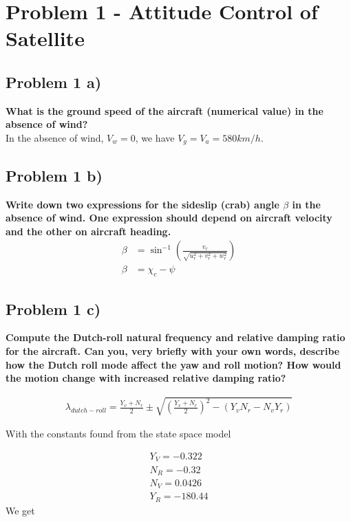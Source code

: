\section*{Problem 1 - Attitude Control of Satellite}

\subsection*{Problem 1 a)} 

\textbf{What is the ground speed of the aircraft (numerical value) in the absence of wind?} \\
In the absence of wind, $V_w = 0$, we have $V_g = V_a = 580 km/h$.

\subsection*{Problem 1 b)}

\textbf{Write down two expressions for the sideslip (crab) angle $\beta$ in the absence of wind. One expression should depend on aircraft velocity and the other on aircraft heading.} \\

\begin{align}
    \beta &= \sin^{-1}\left( \frac{v_r}{\sqrt{u_r^2 + v_r^2+w_r^2}}\right ) \\
    \beta &= \chi_c - \psi
\end{align}

\subsection*{Problem 1 c)}

\textbf{Compute the Dutch-roll natural frequency and relative damping ratio for the aircraft. Can you,
very briefly with your own words, describe how the Dutch roll mode affect the yaw and roll
motion? How would the motion change with increased relative damping ratio?}

\begin{align}
    \lambda_{dutch-roll} = \frac{Y_v+N_r}{2 }\pm \sqrt{\left(\frac{Y_v+N_r}{2}\right)^2 - \left(Y_vN_r - N_vY_r\right)}
\end{align}

With the constants found from the state space model 

\begin{align}
    Y_V = -0.322 \\ 
    N_R = -0.32 \\
    N_V = 0.0426 \\
    Y_R = -180.44
\end{align}
We get 

